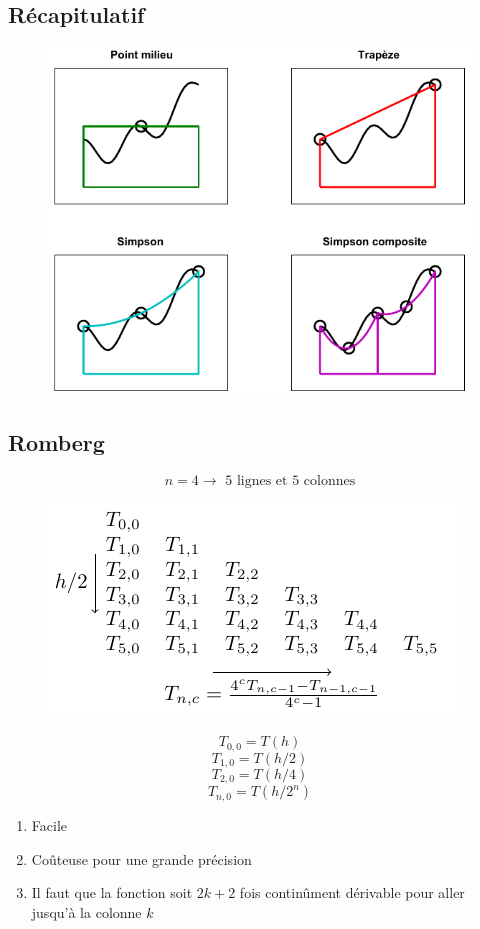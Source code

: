 \documentclass[resume]{subfiles}
\begin{document}
	\subsection{Récapitulatif}
	\begin{figure}[H]
	\centering
	\includegraphics[width=\columnwidth]{img_8.pdf}
	\end{figure}
	\subsection{Romberg}
	$$n=4\longrightarrow \text{ 5 lignes et 5 colonnes}$$
	\begin{figure}[H]
	\centering
	\includegraphics[scale=1]{drwg_5.pdf}
	\end{figure}
	$$T_{0,0}=T(h)$$
	$$T_{1,0}=T(h/2)$$
	$$T_{2,0}=T(h/4)$$
	$$T_{n,0}=T(h/2^n)$$	
	\begin{enumerate}
	\item Facile
	\item Coûteuse pour une grande précision
	\item Il faut que la fonction soit $2k+2$ fois continûment dérivable pour aller jusqu'à la colonne $k$
	\end{enumerate}	
\end{document}
